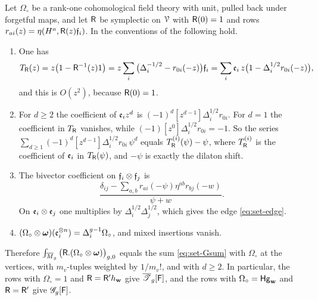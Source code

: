\begin{lem}
\label{lem:fra-unfold}
Let $\Omega_{\circ}$ be a rank-one cohomological field theory with unit, pulled back under forgetful maps, and let $\mathsf{R}$ be symplectic on $\mathcal{V}$ with $\mathsf{R}(0)=1$ and rows $r_{ai}(z)=\eta(H^a,\mathsf{R}(z)\mathfrak{f}_i)$. In the conventions of \cite[Definitions~2.2, 2.5, 2.13]{PPZ15} the following hold.
\begin{enumerate}
\item One has
\[
T_{\mathsf{R}}(z)=z\big(1-\mathsf{R}^{-1}(z)1\big)=z\sum_i\big(\Delta_i^{-1/2}-r_{0i}(-z)\big)\mathfrak{f}_i=\sum_i\mathfrak{e}_i\,z\big(1-\Delta_i^{1/2}r_{0i}(-z)\big),
\]
and this is $O(z^2)$, because $\mathsf{R}(0)=1$.
\item For $d\geq2$ the coefficient of $\mathfrak{e}_iz^d$ is $(-1)^d[z^{d-1}]\Delta_i^{1/2}r_{0i}$. For $d=1$ the coefficient in $T_{\mathsf{R}}$ vanishes, while $(-1)[z^0]\Delta_i^{1/2}r_{0i}=-1$. So the series $\sum_{d\geq1}(-1)^d[z^{d-1}]\Delta_i^{1/2}r_{0i}\,\psi^d$ equals $T_{\mathsf{R}}^{(i)}(\psi)-\psi$, where $T_{\mathsf{R}}^{(i)}$ is the coefficient of $\mathfrak{e}_i$ in $T_{\mathsf{R}}(\psi)$, and $-\psi$ is exactly the dilaton shift.
\item The bivector coefficient on $\mathfrak{f}_i\otimes\mathfrak{f}_j$ is
\[
\frac{\delta_{ij}-\sum_{a,b}r_{ai}(-\psi)\eta^{ab}r_{bj}(-w)}{\psi+w}.
\]
On $\mathfrak{e}_i\otimes\mathfrak{e}_j$ one multiplies by $\Delta_i^{1/2}\Delta_j^{1/2}$, which gives the edge \eqref{eq:set-edge}.
\item $(\Omega_{\circ}\otimes\boldsymbol{\omega})(\mathfrak{e}_i^{\otimes n})=\Delta_i^{g-1}\Omega_{\circ}$, and mixed insertions vanish.
\end{enumerate}
Therefore $\int_{\overline{M}_g}\big(\mathsf{R}.(\Omega_{\circ}\otimes\boldsymbol{\omega})\big)_{g,0}$ equals the sum \eqref{eq:set-Gsum} with $\Omega_{\circ}$ at the vertices, with $m_v$-tuples weighted by $1/m_v!$, and with $d\geq2$. In particular, the rows with $\Omega_{\circ}=1$ and $\mathsf{R}=\mathsf{R}'h_{\mathbf{w}}$ give $\overline{\mathscr{T}}_g[\mathsf{F}]$, and the rows with $\Omega_{\circ}=\mathsf{Hg}_{\mathbf{w}}$ and $\mathsf{R}=\mathsf{R}'$ give $\mathscr{G}_g[\mathsf{F}]$.
\end{lem}

